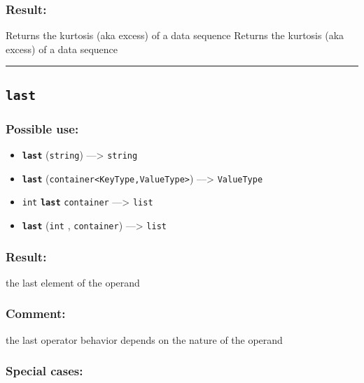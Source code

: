 \documentclass[]{book}
\providecommand{\tightlist}{%
  \setlength{\itemsep}{0pt}\setlength{\parskip}{0pt}}
\theoremstyle{definition}
\theoremstyle{definition}
\theoremstyle{definition}
\theoremstyle{remark}
\begin{document}
\subsubsection{Result:}\label{result-305}

Returns the kurtosis (aka excess) of a data sequence Returns the
kurtosis (aka excess) of a data sequence

\begin{center}\rule{0.5\linewidth}{\linethickness}\end{center}

\subsection{\texorpdfstring{\texttt{last}}{last}}\label{last}

\subsubsection{Possible use:}\label{possible-use-316}

\begin{itemize}
\tightlist
\item
  \textbf{\texttt{last}} (\texttt{string}) ---\textgreater{}
  \texttt{string}
\item
  \textbf{\texttt{last}}
  (\texttt{container\textless{}KeyType,ValueType\textgreater{}})
  ---\textgreater{} \texttt{ValueType}
\item
  \texttt{int} \textbf{\texttt{last}} \texttt{container}
  ---\textgreater{} \texttt{list}
\item
  \textbf{\texttt{last}} (\texttt{int} , \texttt{container})
  ---\textgreater{} \texttt{list}
\end{itemize}

\subsubsection{Result:}\label{result-306}

the last element of the operand

\subsubsection{Comment:}\label{comment-56}

the last operator behavior depends on the nature of the operand

\subsubsection{Special cases:}\label{special-cases-84}
\end{document}
